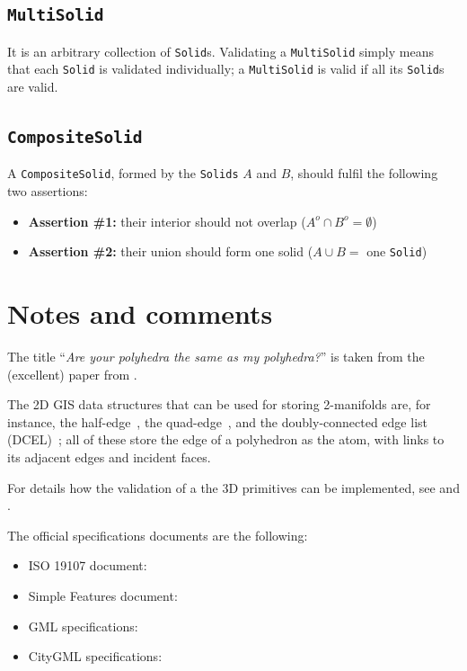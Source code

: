 \subsection{\texttt{MultiSolid}}
It is an arbitrary collection of \texttt{Solid}s.
Validating a \texttt{MultiSolid} simply means that each \texttt{Solid} is validated individually; a \texttt{MultiSolid} is valid if all its \texttt{Solid}s are valid.


\subsection{\texttt{CompositeSolid}}
A \texttt{CompositeSolid}, formed by the \texttt{Solids} $A$ and $B$, should fulfil the following two assertions:
\begin{itemize}
  \item \textbf{Assertion \#1:} their interior should not overlap ($A^{o} \cap B^{o} = \emptyset$)
  \item \textbf{Assertion \#2:} their union should form one solid ($A \cup B =$ one \texttt{Solid})
\end{itemize}


%
\section{Notes and comments}

The title ``\emph{Are your polyhedra the same as my polyhedra?}'' is taken from the (excellent) paper from \citet{Grunbaum03}.

The 2D GIS data structures that can be used for storing 2-manifolds are, for instance, the half-edge~\citep{Mantyla88}, the quad-edge~\citep{Guibas85}, and the doubly-connected edge list (DCEL)~\citep{Muller78}; all of these store the edge of a polyhedron as the atom, with links to its adjacent edges and incident faces.

For details how the validation of a the 3D primitives can be implemented, see \citet{13_cacaie} and \citet{18_ogdss_val3dity}.

The official specifications documents are the following:
\begin{itemize}
  \item ISO 19107 document: \citet{ISO19107}
  \item Simple Features document: \citet{OGC-SF}
  \item GML specifications: \citet{OGC-GML}
  \item CityGML specifications: \citet{CityGML2.0}
\end{itemize}


